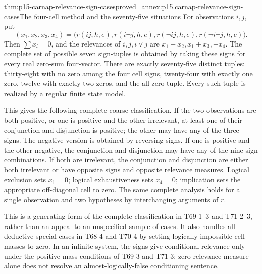 \begin{hbtheorem}{thm:p15-carnap-relevance-sign-cases}{proved=annex:p15.carnap-relevance-sign-cases}{The four-cell method and the seventy-five situations}
For observations \(i,j\), put
\[
 (x_1,x_2,x_3,x_4)=
 \bigl(r(ij,h,e),r(i\neg j,h,e),r(\neg i j,h,e),
       r(\neg i\neg j,h,e)\bigr).
\]
Then \(\sum x_l=0\), and the relevances of \(i,j,i\lor j\)
are \(x_1+x_2,x_1+x_3,-x_4\). The complete set of possible seven
sign-tuples is obtained by taking these signs for every real zero-sum
four-vector. There are exactly seventy-five distinct tuples: thirty-eight
with no zero among the four cell signs, twenty-four with exactly one
zero, twelve with exactly two zeros, and the all-zero tuple. Every such
tuple is realized by a regular finite state model.

This gives the following complete coarse classification. If the two
observations are both positive, or one is positive and the other
irrelevant, at least one of their conjunction and disjunction is positive;
the other may have any of the three signs. The negative version is
obtained by reversing signs. If one is positive and the other negative,
the conjunction and disjunction may have any of the nine sign
combinations. If both are irrelevant, the conjunction and disjunction
are either both irrelevant or have opposite signs and opposite
relevance measures. Logical exclusion sets \(x_1=0\); logical
exhaustiveness sets \(x_4=0\); implication sets the appropriate
off-diagonal cell to zero. The same complete analysis holds for a single
observation and two hypotheses by interchanging arguments of \(r\).
\end{hbtheorem}

This is a generating form of the complete classification in T69-1--3
and T71-2--3, rather than an appeal to an unspecified sample of cases.
It also handles all deductive special cases in T68-4 and T70-4 by
setting logically impossible cell masses to zero. In an infinite system,
the signs give conditional relevance only under the positive-mass
conditions of T69-3 and T71-3; zero relevance measure alone does not
resolve an almost-logically-false conditioning sentence.

